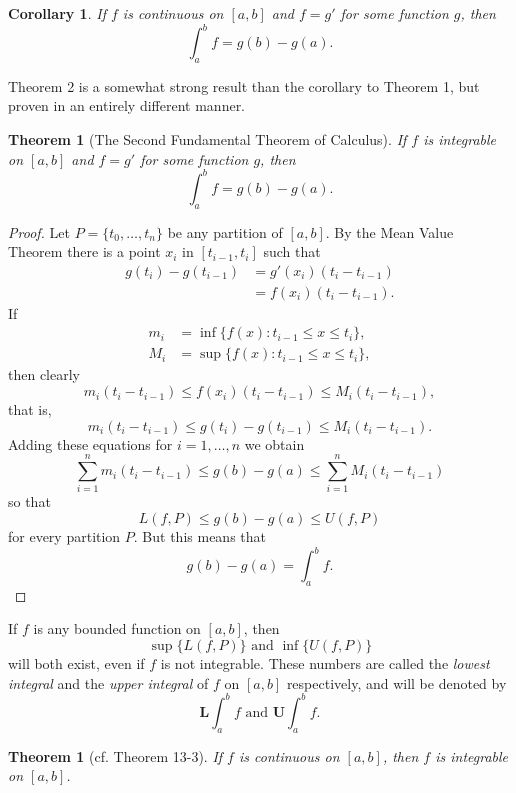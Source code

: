 \documentclass{article}
\newtheorem{corollary}{Corollary}
\newtheorem*{theorem*}{Theorem}
\newtheorem{theorem}{Theorem}
\begin{document}
\begin{corollary}
  If $f$ is continuous on $[a, b]$ and $f = g'$ for some function $g$, then \[
    \int_a^b f = g(b) - g(a).
  \]
\end{corollary}

Theorem 2 is a somewhat strong result than the corollary to Theorem 1, but
proven in an entirely different manner.

\begin{theorem}[The Second Fundamental Theorem of Calculus]
  If $f$ is integrable on $[a, b]$ and $f = g'$ for some function $g$, then \[
    \int_a^b f = g(b) - g(a).
  \]
\end{theorem}
\begin{proof}
  Let $P = \{t_0, \ldots, t_n\}$ be any partition of $[a, b]$. By the Mean
  Value Theorem there is a point $x_i$ in $[t_{i-1}, t_i]$ such that
  \begin{align*}
    g(t_i) - g(t_{i-1})
    &= g'(x_i)(t_i - t_{i-1}) \\
    &= f(x_i)(t_i - t_{i-1}).
  \end{align*}
  If
  \begin{align*}
    m_i &= \inf\{f(x): t_{i-1} \leq x \leq t_i\}, \\
    M_i &= \sup\{f(x): t_{i-1} \leq x \leq t_i\},
  \end{align*}
  then clearly \[
    m_i(t_i - t_{i-1}) \leq f(x_i)(t_i - t_{i-1}) \leq M_i(t_i - t_{i-1}),
  \] that is, \[
    m_i(t_i - t_{i-1}) \leq g(t_i) - g(t_{i-1}) \leq M_i(t_i - t_{i-1}).
  \] Adding these equations for $i = 1, \ldots, n$ we obtain \[
    \sum_{i=1}^n m_i(t_i - t_{i-1})
    \leq g(b) - g(a)
    \leq \sum_{i=1}^n M_i(t_i - t_{i-1})
  \] so that \[
    L(f, P) \leq g(b) - g(a) \leq U(f, P)
  \] for every partition $P$. But this means that \[
    g(b) - g(a) = \int_a^b f.
  \]
\end{proof}

If $f$ is any bounded function on $[a, b]$, then \[
  \sup\{L(f, P)\} \text{ and } \inf\{U(f, P)\}
\] will both exist, even if $f$ is not integrable. These numbers
are called the \emph{lowest integral} and the \emph{upper integral} of $f$ on
$[a, b]$ respectively, and will be denoted by \[
  \textbf{L}\int_a^b f \text{ and } \textbf{U}\int_a^b f.
\]

\begin{theorem*}[cf. Theorem 13-3]
  If $f$ is continuous on $[a, b]$, then $f$ is integrable on $[a, b]$.
\end{theorem*}
\end{document}
